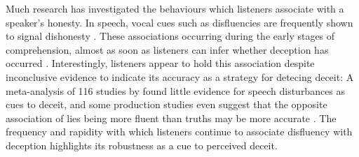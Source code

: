 \documentclass[a4paper,man,natbib]{apa6}
\begin{document}
Much research has investigated the behaviours which listeners associate with a speaker's honesty.
In speech, vocal cues such as disfluencies are frequently shown to signal dishonesty \citep{Zuckerman1981}.%
These associations occurring during the early stages of comprehension, almost as soon as listeners can infer whether deception has occurred \citep{Loy2017}.
Interestingly, listeners appear to hold this association despite inconclusive evidence to indicate its accuracy as a strategy for detecing deceit: A meta-analysis of 116 studies by \citet{DePaulo2003} found little evidence for speech disturbances as cues to deceit, and some production studies even suggest that the opposite association of lies being more fluent than truths may be more accurate \citep[e.g.][]{Arciuli2009}.
The frequency and rapidity with which listeners continue to associate disfluency with deception highlights its robustness as a cue to perceived deceit. %
\end{document}
